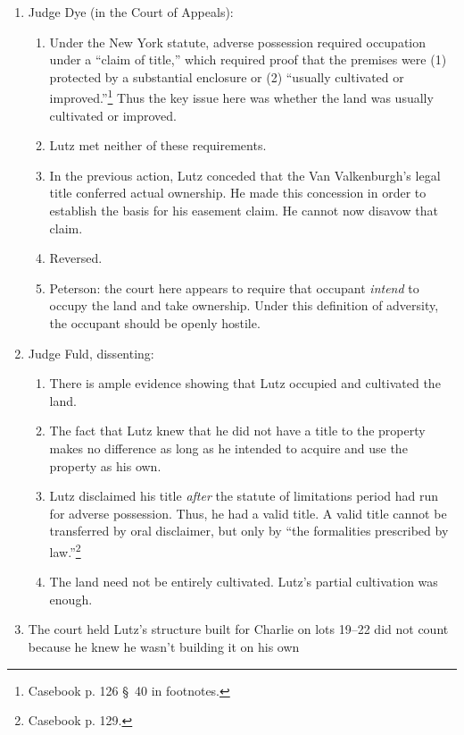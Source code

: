 \begin{enumerate}
    \item Judge Dye (in the Court of Appeals):
    \begin{enumerate}
        \item Under the New York statute, adverse possession required occupation under a ``claim of 
        title,'' which required proof that the premises were (1) protected by a 
        substantial enclosure or (2) ``usually cultivated or 
        improved.''\footnote{Casebook p. 126 \S\ 40 in footnotes.} Thus the 
        key issue here was whether the land was usually cultivated or 
        improved.
        \item Lutz met neither of these requirements.
        \item In the previous action, Lutz conceded that the Van 
        Valkenburgh's legal title conferred actual ownership. He made this 
        concession in order to establish the basis for his easement claim. 
        He cannot now disavow that claim.
        \item Reversed.
        \item Peterson: the court here appears to require that occupant 
        \emph{intend} to occupy the land and take ownership. Under this 
        definition of adversity, the occupant should be openly hostile.
    \end{enumerate}
    \item Judge Fuld, dissenting:
    \begin{enumerate}
        \item There is ample evidence showing that Lutz occupied and 
        cultivated the land.
        \item The fact that Lutz knew that he did not have a title to the 
        property makes no difference as long as he intended to acquire and use 
        the property as his own.
        \item Lutz disclaimed his title \emph{after} the statute of 
        limitations period had run for adverse possession. Thus, he had a 
        valid title. A valid title cannot be transferred by oral disclaimer, 
        but only by ``the formalities prescribed by law.''\footnote{Casebook 
        p. 129.}
        \item The land need not be entirely cultivated. Lutz's partial 
        cultivation was enough.
    \end{enumerate}
    \item The court held Lutz's structure built for Charlie on 
    lots 19--22 did not count because he knew he wasn't building it on his own 

\end{enumerate}
